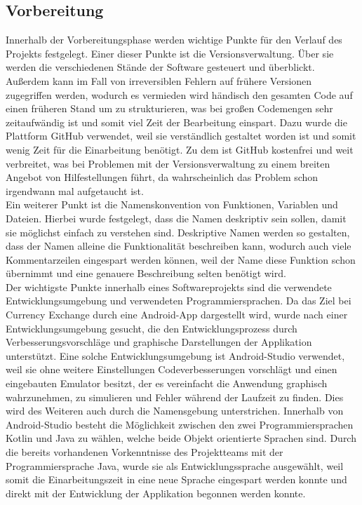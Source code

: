 \documentclass[conference]{IEEEtran}
\begin{document}
\subsection{Vorbereitung}
Innerhalb der Vorbereitungsphase werden wichtige Punkte für den Verlauf des Projekts festgelegt. Einer dieser Punkte ist die Versionsverwaltung. Über sie werden die verschiedenen Stände der Software gesteuert und überblickt. Außerdem kann im Fall von irreversiblen Fehlern auf frühere Versionen zugegriffen werden, wodurch es vermieden wird händisch den gesamten Code auf einen früheren Stand um zu strukturieren, was bei großen Codemengen sehr zeitaufwändig ist und somit viel Zeit der Bearbeitung einspart. Dazu wurde die Plattform GitHub verwendet, weil sie verständlich gestaltet worden ist und somit wenig Zeit für die Einarbeitung benötigt. Zu dem ist GitHub kostenfrei und weit verbreitet, was bei Problemen mit der Versionsverwaltung zu einem breiten Angebot von Hilfestellungen führt, da wahrscheinlich das Problem schon irgendwann mal aufgetaucht ist.\\
Ein weiterer Punkt ist die Namenskonvention von Funktionen, Variablen und Dateien. Hierbei wurde festgelegt, dass die Namen deskriptiv sein sollen, damit sie möglichst einfach zu verstehen sind. Deskriptive Namen werden so gestalten, dass der Namen alleine die Funktionalität beschreiben kann, wodurch auch viele Kommentarzeilen eingespart werden können, weil der Name diese Funktion schon übernimmt und eine genauere Beschreibung selten benötigt wird.\\
Der wichtigste Punkte innerhalb eines Softwareprojekts sind die verwendete Entwicklungsumgebung und verwendeten Programmiersprachen. Da das Ziel bei Currency Exchange durch eine Android-App dargestellt wird, wurde nach einer Entwicklungsumgebung gesucht, die den Entwicklungsprozess durch Verbesserungsvorschläge und graphische Darstellungen der Applikation unterstützt. Eine solche Entwicklungsumgebung ist Android-Studio verwendet, weil sie ohne weitere Einstellungen Codeverbesserungen vorschlägt und einen eingebauten Emulator besitzt, der es vereinfacht die Anwendung graphisch wahrzunehmen, zu simulieren und Fehler während der Laufzeit zu finden. Dies wird des Weiteren auch durch die Namensgebung unterstrichen. Innerhalb von Android-Studio besteht die Möglichkeit zwischen den zwei Programmiersprachen Kotlin und Java zu wählen, welche beide Objekt orientierte Sprachen sind. Durch die bereits vorhandenen Vorkenntnisse des Projektteams mit der Programmiersprache Java, wurde sie als Entwicklungssprache ausgewählt, weil somit die Einarbeitungszeit in eine neue Sprache eingespart werden konnte und direkt mit der Entwicklung der Applikation begonnen werden konnte.
\end{document}
